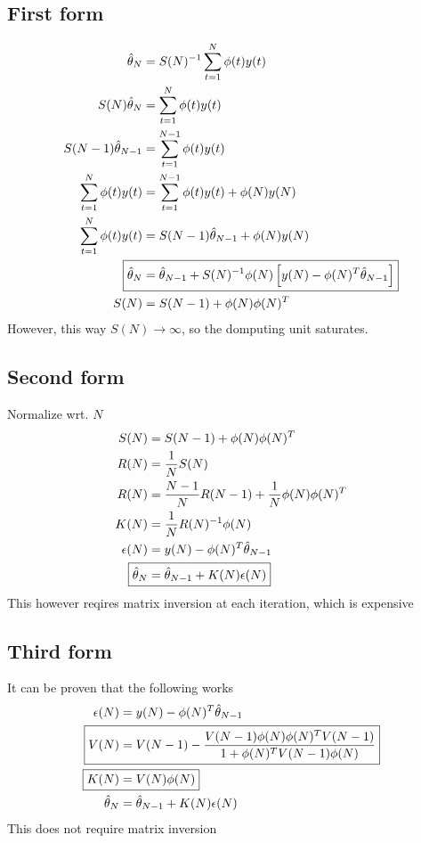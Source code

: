 \documentclass{report}
\begin{document}
\subsection{First form}
\begin{align*}
\hat{\theta}_N&=S(N)^{-1}\sum_{t=1}^N \phi(t)y(t)\\
S(N)\hat{\theta}_N&=\sum_{t=1}^N \phi(t)y(t)\\
S(N-1)\hat{\theta}_{N-1}&=\sum_{t=1}^{N-1} \phi(t)y(t)\\
\sum_{t=1}^N \phi(t)y(t)&=\sum_{t=1}^{N-1} \phi(t)y(t)+\phi(N)y(N)\\
\sum_{t=1}^N \phi(t)y(t)&=S(N-1)\hat{\theta}_{N-1}+\phi(N)y(N)\\
\Aboxed{
\hat{\theta}_N&=\hat{\theta}_{N-1}+S(N)^{-1}\phi(N)\left[y(N)-\phi(N)^T\hat{\theta}_{N-1}\right]
}\\
S(N)&=S(N-1)+\phi(N)\phi(N)^T
\end{align*}
However, this way $S(N)\to\infty$, so the domputing unit saturates.
\subsection{Second form} Normalize wrt. $N$
\begin{align*}
S(N)&=S(N-1)+\phi(N)\phi(N)^T\\
R(N)&=\frac{1}{N}S(N)\\
R(N)&=\frac{N-1}{N}R(N-1)+\frac{1}{N}\phi(N)\phi(N)^T\\
K(N)&=\frac{1}{N}R(N)^{-1}\phi(N)\\
\epsilon(N)&=y(N)-\phi(N)^T\hat{\theta}_{N-1}\\
\Aboxed{
\hat{\theta}_N&=\hat{\theta}_{N-1}+K(N)\epsilon(N)
}
\end{align*}
This however reqires matrix inversion at each iteration, which is expensive
\subsection{Third form} 
It can be proven that the following works
\begin{align*}
\epsilon(N)&=y(N)-\phi(N)^T\hat{\theta}_{N-1}\\
\Aboxed{
V(N)&=V(N-1)-
\frac{
	V(N-1)\phi(N)\phi(N)^TV(N-1)
}{
	1+\phi(N)^TV(N-1)\phi(N)
}
}\\
\Aboxed{
K(N)&=V(N)\phi(N)
}\\
\hat{\theta}_N&=\hat{\theta}_{N-1}+K(N)\epsilon(N)
\end{align*}
This does not require matrix inversion
\end{document}
